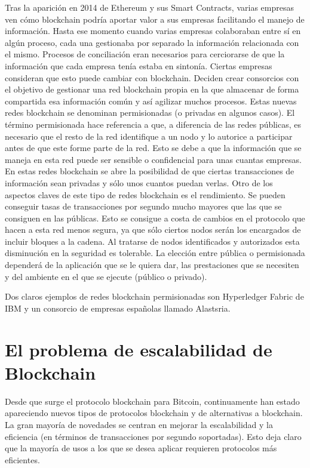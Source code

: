 Tras la aparición en 2014 de Ethereum y sus Smart Contracts, varias empresas ven cómo blockchain podría aportar valor a sus empresas facilitando el manejo de información. Hasta ese momento cuando varias empresas colaboraban entre sí en algún proceso, cada una gestionaba por separado la información relacionada con el mismo. Procesos de conciliación eran necesarios para cerciorarse de que la información que cada empresa tenía estaba en sintonía. Ciertas empresas consideran que esto puede cambiar con blockchain. Deciden crear consorcios con el objetivo de gestionar una red blockchain propia en la que almacenar de forma compartida esa información común y así agilizar muchos procesos.
Estas nuevas redes blockchain se denominan permisionadas (o privadas en algunos casos). El término permisionada hace referencia a que, a diferencia de las redes públicas, es necesario que el resto de la red identifique a un nodo y lo autorice a participar antes de que este forme parte de la red. Esto se debe a que la información que se maneja en esta red puede ser sensible o confidencial para unas cuantas empresas. En estas redes blockchain se abre la posibilidad de que ciertas transacciones de información sean privadas y sólo unos cuantos puedan verlas. Otro de los aspectos claves de este tipo de redes blockchain es el rendimiento. Se pueden conseguir tasas de transacciones por segundo mucho mayores que las que se consiguen en las públicas. Esto se consigue a costa de cambios en el protocolo que hacen a esta red menos segura, ya que sólo ciertos nodos serán los encargados de incluir bloques a la cadena. Al tratarse de nodos identificados y autorizados esta disminución en la seguridad es tolerable. La elección entre pública o permisionada dependerá de la aplicación que se le quiera dar, las prestaciones que se necesiten y del ambiente en el que se ejecute (público o privado). \newline

Dos claros ejemplos de redes blockchain permisionadas son Hyperledger Fabric de IBM y un consorcio de empresas españolas llamado Alastsria.

\section{El problema de escalabilidad de Blockchain}
Desde que surge el protocolo blockchain para Bitcoin, continuamente han estado apareciendo nuevos tipos de protocolos blockchain y de alternativas a blockchain. La gran mayoría de novedades se centran en mejorar la escalabilidad y la eficiencia (en términos de transacciones por segundo soportadas). Esto deja claro que la mayoría de usos a los que se desea aplicar requieren protocolos más eficientes.


